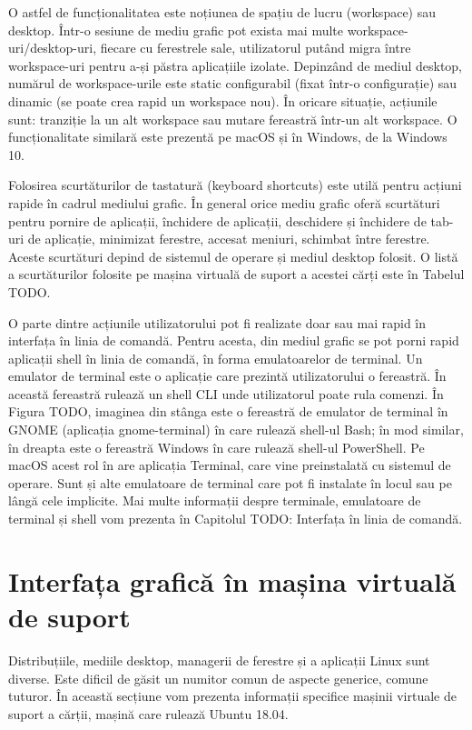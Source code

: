 O astfel de funcționalitatea este noțiunea de spațiu de lucru (workspace) sau desktop. Într-o sesiune de mediu grafic pot exista mai multe workspace-uri/desktop-uri, fiecare cu ferestrele sale, utilizatorul putând migra între workspace-uri pentru a-și păstra aplicațiile izolate. Depinzând de mediul desktop, numărul de workspace-urile este static configurabil (fixat într-o configurație) sau dinamic (se poate crea rapid un workspace nou). În oricare situație, acțiunile sunt: tranziție la un alt workspace sau mutare fereastră într-un alt workspace. O funcționalitate similară este prezentă pe macOS și în Windows, de la Windows 10.

Folosirea scurtăturilor de tastatură (keyboard shortcuts) este utilă pentru acțiuni rapide în cadrul mediului grafic. În general orice mediu grafic oferă scurtături pentru pornire de aplicații, închidere de aplicații, deschidere și închidere de tab-uri de aplicație, minimizat ferestre, accesat meniuri, schimbat între ferestre. Aceste scurtături depind de sistemul de operare și mediul desktop folosit. O listă a scurtăturilor folosite pe mașina virtuală de suport a acestei cărți este în Tabelul TODO.

O parte dintre acțiunile utilizatorului pot fi realizate doar sau mai rapid în interfața în linia de comandă. Pentru acesta, din mediul grafic se pot porni rapid aplicații shell în linia de comandă, în forma emulatoarelor de terminal. Un emulator de terminal este o aplicație care prezintă utilizatorului o fereastră. În această fereastră rulează un shell CLI unde utilizatorul poate rula comenzi. În Figura TODO, imaginea din stânga este o fereastră de emulator de terminal în GNOME (aplicația gnome-terminal) în care rulează shell-ul Bash; în mod similar, în dreapta este o fereastră Windows în care rulează shell-ul PowerShell. Pe macOS acest rol în are aplicația Terminal, care vine preinstalată cu sistemul de operare. Sunt și alte emulatoare de terminal care pot fi instalate în locul sau pe lângă cele implicite. Mai multe informații despre terminale, emulatoare de terminal și shell vom prezenta în Capitolul TODO: Interfața în linia de comandă.

\section{Interfața grafică în mașina virtuală de suport}
\label{sec:ui:vm}

Distribuțiile, mediile desktop, managerii de ferestre și a aplicații Linux sunt diverse. Este dificil de găsit un numitor comun de aspecte generice, comune tuturor. În această secțiune vom prezenta informații specifice mașinii virtuale de suport a cărții, mașină care rulează Ubuntu 18.04.

